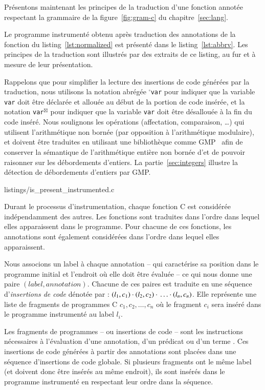 Présentons maintenant les principes de la traduction d'une fonction annotée
respectant la grammaire de la figure~\ref{fig:gram-c} du
chapitre~\ref{sec:lang}.

Le programme instrumenté obtenu après traduction des annotations de la fonction
du listing~\ref{lst:normalized} est présenté dans le listing~\ref{lst:abbrv}.
Les principes de la traduction sont illustrés par des extraits de ce listing,
au fur et à mesure de leur présentation.

Rappelons que pour simplifier la lecture des insertions de code générées par la
traduction, nous utilisons la notation abrégée ${}^{\square}$\lstinline'var' pour
indiquer que la variable \lstinline'var' doit être déclarée et allouée au début
de la portion de code insérée, et la notation \lstinline'var'${}^{\boxtimes}$ pour
indiquer que la variable \lstinline'var' doit être désallouée à la fin du code
inséré.
Nous soulignons les opérations (affectation, comparaison, \dots) qui utilisent
l'arithmétique non bornée (par opposition à l'arithmétique modulaire), et
doivent être traduites en utilisant une bibliothèque comme GMP~\cite{GMP} afin
de conserver la sémantique de l'arithmétique entière non bornée d'\eacsl et de
pouvoir raisonner sur les débordements d'entiers.
La partie~\ref{sec:integers} illustre la détection de débordements d'entiers par
GMP.



                {listings/is_present_instrumented.c}


Durant le processus d'instrumentation, chaque fonction C est considérée
indépendamment des autres.
Les fonctions sont traduites dans l'ordre dans lequel elles apparaissent dans le
programme.
Pour chacune de ces fonctions, les annotations \eacsl sont également considérées
dans l'ordre dans lequel elles apparaissent.

Nous associons un label à chaque annotation -- qui caractérise sa position dans
le programme initial et l'endroit où elle doit être évaluée -- ce qui nous
donne une paire $(label, annotation)$.
Chacune de ces paires est traduite en une séquence
d'\emph{insertions de code} dénotée par :
$(l_1, c_1) \cdot{} (l_2, c_2) \cdot{} \ldots \cdot{} (l_n, c_n)$.
Elle représente une liste de fragments de programmes C $c_1, c_2, \ldots, c_n$
où le fragment $c_i$ sera inséré dans le programme instrumenté au label $l_i$.

Les fragments de programmes -- ou insertions de code -- sont les instructions
nécessaires à l'évaluation d'une annotation, d'un prédicat ou d'un terme
\eacsl.
Ces insertions de code générées à partir des annotations sont placées
dans une séquence d'insertions de code globale.
Si plusieurs fragments ont le même label (et doivent donc être insérés au
même endroit), ils sont insérés dans le programme instrumenté en respectant leur
ordre dans la séquence.

